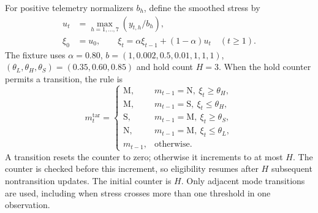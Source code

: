 For positive telemetry normalizers $b_h$, define the smoothed stress by
\begin{equation}
 \begin{aligned}
  u_t&=\max_{h=1,\ldots,7}(y_{t,h}/b_h),\\
  \xi_0&=u_0,\qquad
  \xi_t=\alpha\xi_{t-1}+(1-\alpha)u_t\quad(t\geq1).
 \end{aligned}
 \label{eq:baseline_hys_stress}
\end{equation}
The fixture uses $\alpha=0.80$,
$b=(1,0.002,0.5,0.01,1,1,1)$,
$(\theta_L,\theta_H,\theta_S)=(0.35,0.60,0.85)$ and hold count $H=3$.
When the hold counter permits a transition, the rule is
\begin{equation}
 m_t^{\mathrm{tar}}=
 \begin{cases}
  \mathrm{M},&m_{t-1}=\mathrm{N},\ \xi_t\geq\theta_H,\\
  \mathrm{M},&m_{t-1}=\mathrm{S},\ \xi_t\leq\theta_H,\\
  \mathrm{S},&m_{t-1}=\mathrm{M},\ \xi_t\geq\theta_S,\\
  \mathrm{N},&m_{t-1}=\mathrm{M},\ \xi_t\leq\theta_L,\\
  m_{t-1},&\text{otherwise}.
 \end{cases}
 \label{eq:baseline_hys_transition}
\end{equation}
A transition resets the counter to zero; otherwise it increments to at most
$H$. The counter is checked before this increment, so eligibility resumes
after $H$ subsequent nontransition updates. The initial counter is $H$.
Only adjacent mode transitions are used, including when stress crosses more
than one threshold in one observation.

